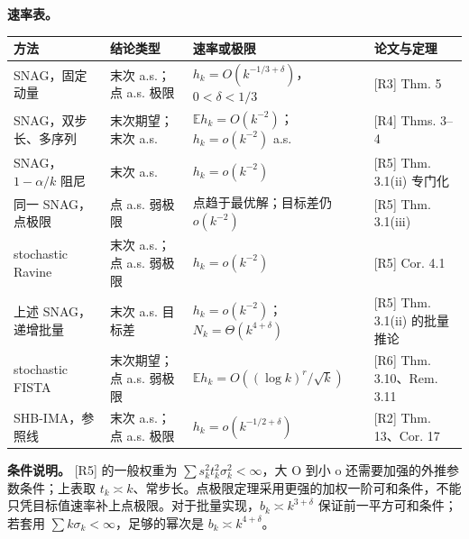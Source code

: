 \documentclass[
  chinese,
  10pt,
  a4paper,
]{article}
\newcounter{none} %
\begin{document}
\textbf{速率表。}

{\def\LTcaptype{none} %
\begin{longtable}[]{@{}
  >{\raggedright\arraybackslash}p{}
  >{\raggedright\arraybackslash}p{}
  >{\raggedright\arraybackslash}p{}
  >{\raggedright\arraybackslash}p{}@{}}
\toprule\noalign{}
\begin{minipage}[b]{\linewidth}\raggedright
方法
\end{minipage} & \begin{minipage}[b]{\linewidth}\raggedright
结论类型
\end{minipage} & \begin{minipage}[b]{\linewidth}\raggedright
速率或极限
\end{minipage} & \begin{minipage}[b]{\linewidth}\raggedright
论文与定理
\end{minipage} \\
\midrule\noalign{}
\endhead
\bottomrule\noalign{}
\endlastfoot
SNAG，固定动量 & 末次 a.s.；点 a.s. 极限 &
\(h_k=O(k^{-1/3+\delta})\)，\(0<\delta<1/3\) & {[}R3{]} Thm. 5 \\
SNAG，双步长、多序列 & 末次期望；末次 a.s. &
\(\mathbb E h_k=O(k^{-2})\)；\(h_k=o(k^{-2})\) a.s. & {[}R4{]} Thms.
3--4 \\
SNAG，\(1-\alpha/k\) 阻尼 & 末次 a.s. & \(h_k=o(k^{-2})\) & {[}R5{]}
Thm. 3.1(ii) 专门化 \\
同一 SNAG，点极限 & 点 a.s. 弱极限 & 点趋于最优解；目标差仍
\(o(k^{-2})\) & {[}R5{]} Thm. 3.1(iii) \\
stochastic Ravine & 末次 a.s.；点 a.s. 弱极限 & \(h_k=o(k^{-2})\) &
{[}R5{]} Cor. 4.1 \\
上述 SNAG，递增批量 & 末次 a.s. 目标差 &
\(h_k=o(k^{-2})\)；\(N_k=\Theta(k^{4+\delta})\) & {[}R5{]} Thm. 3.1(ii)
的批量推论 \\
stochastic FISTA & 末次期望；点 a.s. 弱极限 &
\(\mathbb E h_k=O((\log k)^r/\sqrt{k})\) & {[}R6{]} Thm. 3.10、Rem.
3.11 \\
SHB-IMA，参照线 & 末次 a.s.；点 a.s. 极限 & \(h_k=o(k^{-1/2+\delta})\) &
{[}R2{]} Thm. 13、Cor. 17 \\
\end{longtable}
}

\textbf{条件说明。} {[}R5{]} 的一般权重为
\(\sum s_k^2t_k^2\sigma_k^2<\infty\)，大 O 到小 o
还需要加强的外推参数条件；上表取
\(t_k\asymp k\)、常步长。点极限定理采用更强的加权一阶可和条件，不能只凭目标值速率补上点极限。对于批量实现，\(b_k\asymp k^{3+\delta}\)
保证前一平方可和条件；若套用 \(\sum k\sigma_k<\infty\)，足够的幂次是
\(b_k\asymp k^{4+\delta}\)。
\end{document}
